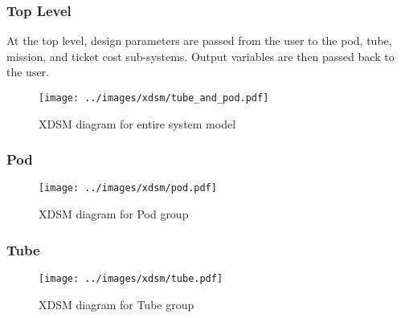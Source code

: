 \subsubsection{Top Level}
	At the top level, design parameters are passed from the user to the pod,
	tube, mission, and ticket cost sub-systems.
	Output variables are then passed back to the user.
	\begin{figure}
		\centering
		\texttt{[image: ../images/xdsm/tube\_and\_pod.pdf]}
		\caption{XDSM diagram for entire system model}
		\label{fig:xdsm:toplevel}
	\end{figure}
\subsubsection{Pod}
	\begin{figure}
		\centering
		\texttt{[image: ../images/xdsm/pod.pdf]}
		\caption{XDSM diagram for Pod group}
		\label{fig:xdsm:pod}
	\end{figure}
\subsubsection{Tube}
	\begin{figure}
		\centering
		\texttt{[image: ../images/xdsm/tube.pdf]}
		\caption{XDSM diagram for Tube group}
		\label{fig:xdsm:tube}
	\end{figure}

